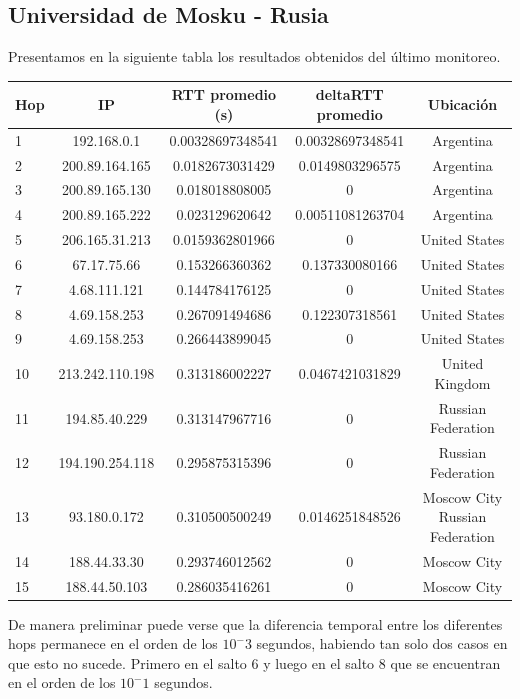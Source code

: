  \subsection{Universidad de Mosku - Rusia}
Presentamos en la siguiente tabla los resultados obtenidos del último monitoreo.

\bigskip

\begin{tabular}{| l | c | c | c | c |}
 \hline 
Hop & IP &  RTT promedio (s)  & deltaRTT promedio & Ubicación\\
\hline 
1  &  192.168.0.1  &  0.00328697348541    &  0.00328697348541 & Argentina\\
\hline 
2  &  200.89.164.165  &  0.0182673031429    &  0.0149803296575 & Argentina\\
\hline 
3  &  200.89.165.130  &  0.018018808005    &  0 & Argentina\\
\hline 
4  &  200.89.165.222  &  0.023129620642   &  0.00511081263704 & Argentina\\
\hline 
5  &  206.165.31.213  &  0.0159362801966    &  0 & United States\\ 
\hline 
6  &  67.17.75.66  &  0.153266360362    &  0.137330080166 &  United States\\
\hline 
7  &  4.68.111.121  &  0.144784176125    &  0 & United States\\ 
\hline 
8  &  4.69.158.253  &  0.267091494686    &  0.122307318561 &  United States\\
\hline 
9  &  4.69.158.253  &  0.266443899045    &  0 & United States\\
\hline 
10  &  213.242.110.198  &  0.313186002227    &  0.0467421031829 & United Kingdom\\
\hline 
11  &  194.85.40.229  &  0.313147967716    &  0 & Russian Federation\\
\hline 
12  &  194.190.254.118  &  0.295875315396    &  0 & Russian Federation\\
\hline 
13  &  93.180.0.172  &  0.310500500249   &  0.0146251848526 & Moscow City Russian Federation\\
\hline 
14  &  188.44.33.30  &  0.293746012562    &  0 & Moscow City\\
\hline 
15  &  188.44.50.103  &  0.286035416261   &  0 & Moscow City\\
\hline 
\end{tabular}

De manera preliminar puede verse que la diferencia temporal entre los diferentes hops permanece en el orden de los $10^-3$ segundos, 
habiendo tan solo dos casos en que esto no sucede. Primero en el salto $6$ y luego en el salto $8$ que se encuentran en el orden de los $10^-1$ 
segundos.

